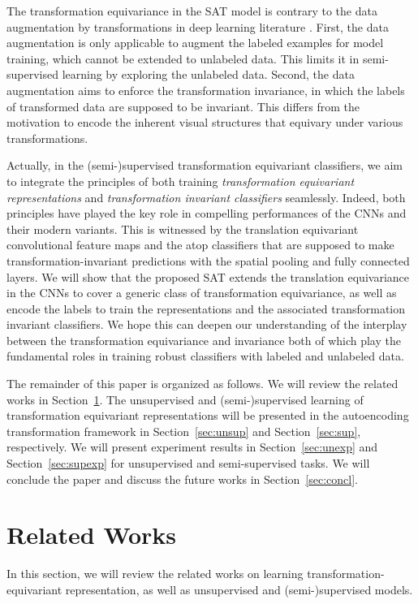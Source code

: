 \documentclass[10pt,journal,compsoc,twoside]{IEEEtran}
\begin{document}
The transformation equivariance in the SAT model is contrary to the data augmentation by transformations in deep learning literature \cite{krizhevsky2012imagenet}. First, the data augmentation is only applicable to augment the labeled examples for model training, which cannot be extended to unlabeled data. This limits it in semi-supervised learning by exploring the unlabeled data. Second, the data augmentation aims to enforce the transformation invariance, in which the labels of transformed data are supposed to be invariant. This differs from the motivation to encode the inherent visual structures that equivary under various transformations.


Actually, in the (semi-)supervised transformation equivariant classifiers, we aim to integrate the principles of both training {\em transformation equivariant representations} and {\em transformation invariant classifiers} seamlessly. Indeed, both principles have played the key role in compelling performances of the CNNs and their modern variants. This is witnessed by the translation equivariant convolutional feature maps and the atop classifiers that are supposed to make transformation-invariant predictions with the spatial pooling and fully connected layers. We will show that the proposed SAT extends the translation equivariance in the CNNs to cover a generic class of transformation equivariance, as well as encode the labels to train the representations and the associated transformation invariant classifiers. We hope this can deepen our understanding of the interplay between the transformation equivariance and invariance both of which play the fundamental roles in training robust classifiers with labeled and unlabeled data.

The remainder of this paper is organized as follows. We will review the related works in Section~\ref{sec:related}.  The unsupervised and (semi-)supervised learning of transformation equivariant representations will be presented in the autoencoding transformation framework in Section~\ref{sec:unsup} and Section~\ref{sec:sup}, respectively.  We will present experiment results in Section~\ref{sec:unexp} and Section~\ref{sec:supexp} for unsupervised and semi-supervised tasks. We will conclude the paper and discuss the future works in Section~\ref{sec:concl}.

\section{Related Works}\label{sec:related}
In this section, we will review the related works on learning transformation-equivariant representation, as well as unsupervised and (semi-)supervised models.
\end{document}
